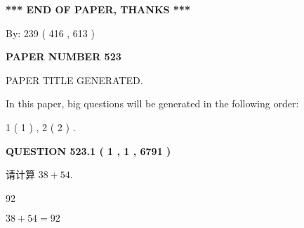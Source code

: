 \documentclass{ctexart}
\begin{document}
   
   
   
\vspace{1.0in} 
{\textbf{\large{ *** END OF PAPER, THANKS *** }}} 
   
   
\hspace{1.0in} By: 
 239 ( 416 ,  613 )
   
   
   
   
\newpage 
\setcounter{page}{ 
   523001 } 
   
   
   
   
 {\textbf{ \Large{ PAPER NUMBER  523  }}}
   
   
\vspace{0.2in}
   
   
   
   
   
   
   
   
 \vspace{0.2in}
 
 
 
 
   
   
 PAPER TITLE GENERATED.
   
   
   
\vspace{0.2in}
   
In this paper, big questions will be generated in the following order: 
   
   
   1 ( 1 )
 ,
   2 ( 2 )
 .
  
\vspace{0.2in}
  
{\textbf{\Large{QUESTION
523.1 
 ( 1 , 1 , 6791 )
}}}
  
  
 
请计算 $ %
38 +  %
54 $.
 
 
 
\noindent{}
 
 

92
 
 
\noindent{}
 
 

 
 
 
\noindent{}
 
 

$ %
38 +  %
54=   %
92$
 
\end{document}
